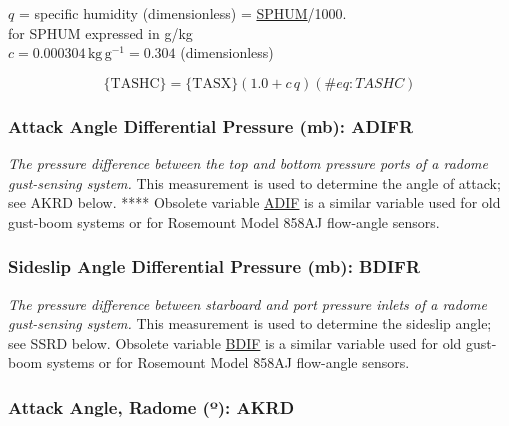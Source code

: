 \documentclass[
  english,
]{book}
\begin{document}
\(q\) = specific humidity (dimensionless) = \href{$sphum}{SPHUM}/1000.\\
\hspace*{0.333em}\hspace*{0.333em}\hspace*{0.333em}\hspace*{0.333em}\hspace*{0.333em}\hspace*{0.333em}
for SPHUM expressed in g/kg\\
\(c=0.000304\,\mathrm{kg\,g^{-1}}=0.304\) (dimensionless)

\begin{equation}
\mathrm{\{TASHC\}} = \mathrm{\{TASX\}} (1.0 + c\,q)  
(\#eq:TASHC)
\end{equation}

\hypertarget{adifr}{%
\subsubsection*{Attack Angle Differential Pressure (mb):
ADIFR}\label{adifr}}

\emph{The pressure difference between the top and bottom pressure ports
of a radome gust-sensing system.} This measurement is used to determine
the angle of attack; see AKRD below. **** Obsolete variable
\underline{ADIF} is a similar variable used for old gust-boom systems or
for Rosemount Model 858AJ flow-angle sensors.

\hypertarget{bdifr}{%
\subsubsection*{Sideslip Angle Differential Pressure (mb):
BDIFR}\label{bdifr}}

\emph{The pressure difference between starboard and port pressure inlets
of a radome gust-sensing system.} This measurement is used to determine
the sideslip angle; see SSRD below. Obsolete variable \underline{BDIF}
is a similar variable used for old gust-boom systems or for Rosemount
Model 858AJ flow-angle sensors.

\hypertarget{akrd}{%
\subsubsection*{\texorpdfstring{Attack Angle, Radome ({º}):
AKRD}{Attack Angle, Radome (º): AKRD}}\label{akrd}}
\end{document}
